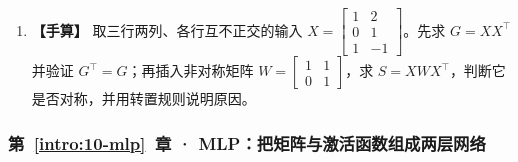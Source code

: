 \begin{enumerate}[label={},leftmargin=4.8em,itemsep=4pt]
\item[\textbf{C-032.}] \leavevmode{}\label{exercise:C-032}\label{exercise:gram-asymmetry}\textbf{【手算】} 取三行两列、各行互不正交的输入 $X=\begin{bmatrix}1&2\\0&1\\1&-1\end{bmatrix}$。先求 $G=XX^\top$ 并验证 $G^\top=G$；再插入非对称矩阵 $W=\begin{bmatrix}1&1\\0&1\end{bmatrix}$，求 $S=XWX^\top$，判断它是否对称，并用转置规则说明原因。
\end{enumerate}
\subsubsection*{第~\ref*{intro:10-mlp}~章 · MLP：把矩阵与激活函数组成两层网络}
